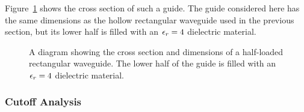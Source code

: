 Figure~\ref{fig:half_filled_rectangular_guide} shows the cross section
of such a guide. The guide considered here has the same dimensions as
the hollow rectangular waveguide used in the previous section, but its
lower half is filled with an $\epsilon_r = 4$ dielectric material.
\begin{figure}
    \centering
    \caption{A diagram showing the cross section and dimensions of a half-loaded rectangular waveguide.  The lower half of the guide is filled with an $\epsilon_r = 4$ dielectric material.}
    \label{fig:half_filled_rectangular_guide}
\end{figure}

\subsubsection{Cutoff Analysis}

